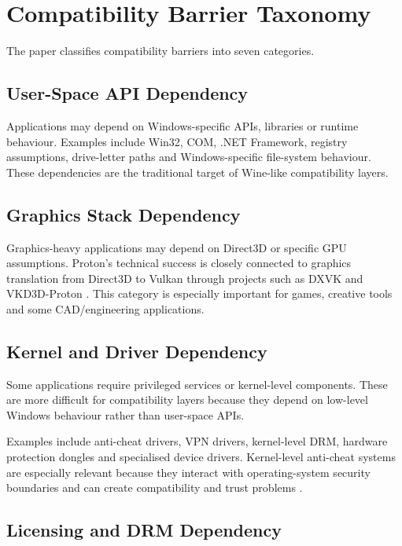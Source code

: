 \documentclass[conference]{IEEEtran}
\begin{document}
\section{Compatibility Barrier Taxonomy}

The paper classifies compatibility barriers into seven categories.

\subsection{User-Space API Dependency}

Applications may depend on Windows-specific APIs, libraries or runtime behaviour. Examples include Win32, COM, .NET Framework, registry assumptions, drive-letter paths and Windows-specific file-system behaviour. These dependencies are the traditional target of Wine-like compatibility layers.

\subsection{Graphics Stack Dependency}

Graphics-heavy applications may depend on Direct3D or specific GPU assumptions. Proton's technical success is closely connected to graphics translation from Direct3D to Vulkan through projects such as DXVK and VKD3D-Proton \cite{dxvk,vkd3dProton}. This category is especially important for games, creative tools and some CAD/engineering applications.

\subsection{Kernel and Driver Dependency}

Some applications require privileged services or kernel-level components. These are more difficult for compatibility layers because they depend on low-level Windows behaviour rather than user-space APIs.

Examples include anti-cheat drivers, VPN drivers, kernel-level DRM, hardware protection dongles and specialised device drivers. Kernel-level anti-cheat systems are especially relevant because they interact with operating-system security boundaries and can create compatibility and trust problems \cite{dorner2024anticheat,areWeAntiCheatYet}.

\subsection{Licensing and DRM Dependency}
\end{document}
